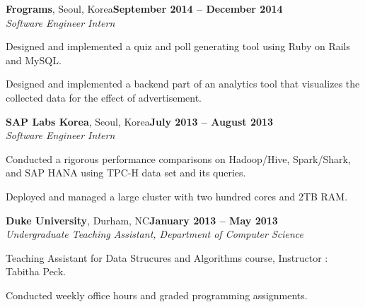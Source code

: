 \documentclass[10pt,margin,line]{resume}
\begin{document}
\begin{resume}
\textbf{Frograms}, Seoul, Korea\hfill \textbf{September 2014 -- December 2014} \vspace{0mm}\\\vspace{0mm}%
\textsl{Software Engineer Intern}
\vspace{-3mm}\\\vspace{-1mm}%
\begin{list3}
    \item Designed and implemented a quiz and poll generating tool using Ruby on Rails and MySQL.
    \item Designed and implemented a backend part of an analytics tool that visualizes the collected data for the effect of advertisement.
\end{list3}

\textbf{SAP Labs Korea}, Seoul, Korea\hfill \textbf{July 2013 -- August 2013} \vspace{0mm}\\\vspace{0mm}%
\textsl{Software Engineer Intern}
\vspace{-3mm}\\\vspace{-1mm}%
\begin{list3}
    \item Conducted a rigorous performance comparisons on Hadoop/Hive, Spark/Shark, and SAP HANA using TPC-H data set and its queries.
    \item Deployed and managed a large cluster with two hundred cores and 2TB RAM.
\end{list3}

\textbf{Duke University}, Durham, NC\hfill \textbf{January 2013 -- May 2013} \vspace{0mm}\\\vspace{0mm}%
\textsl{Undergraduate Teaching Assistant, Department of Computer Science}
\begin{list3}
    \item Teaching Assistant for Data Strucures and Algorithms course, Instructor : Tabitha Peck.
    \item Conducted weekly office hours and graded programming assignments.
\end{list3}


\end{resume}
\end{document}
